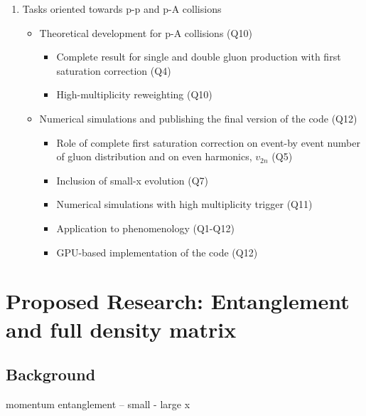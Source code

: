         \begin{enumerate}
            \item  Tasks oriented towards p-p 
				and  p-A  collisions  
                \begin{itemize}
                    \item Theoretical development for p-A collisions (Q10)
                        \begin{itemize}
                            \item Complete result for single and double 
								gluon production with first saturation 
								correction (Q4)
                            \item High-multiplicity reweighting  (Q10)
                        \end{itemize}
                    \item Numerical simulations and publishing the final version 
					of the 	code (Q12)
                        \begin{itemize}
                            \item Role of complete first saturation correction on 
								event-by event number of gluon distribution 
								and on even harmonics, $v_{2n}$ (Q5)
                            \item Inclusion of small-x evolution  (Q7)
                            \item Numerical simulations with
								high multiplicity trigger (Q11)
							\item Application to phenomenology (Q1-Q12)
							\item GPU-based implementation of the code (Q12) 
                        \end{itemize}
                \end{itemize}
        \end{enumerate}

\section{Proposed Research: Entanglement and full density matrix}
    \label{sec:p2}

    \vspace{0.5em}
    \subsection{Background}
    \label{sec:p2b}

momentum entanglement -- small - large x 



